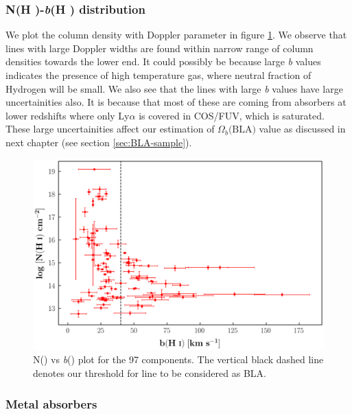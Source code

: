 \subsubsection*{N(H \hspace*{-0.6mm}{\footnotesize I})-\emph{b}(H \hspace*{-0.6mm}{\footnotesize I}) distribution} 

We plot the  column density with Doppler parameter in figure \ref{fig:NHi_bHi}. We observe that lines with large Doppler widths are found within narrow range of column densities towards the lower end. It could possibly be because large \emph{b} values indicates the presence of high temperature gas, where neutral fraction of Hydrogen will be small. We also see that the lines with large \emph{b} values have large uncertainities also. It is because that most of these are coming from absorbers at lower redshifts where only Ly$\alpha$ is covered in COS/FUV, which is saturated. These large uncertainities affect our estimation of $\Omega_b\text{(BLA)}$ value as discussed in next chapter (see section \ref{sec:BLA-sample}). 

\begin{figure}[!h]
    \centering
    \includegraphics[width=\linewidth]{Figures/NHi_vs_bHi.png}
    \caption{N() vs \emph{b}() plot for the 97  components. The vertical black dashed line denotes our threshold for line to be considered as BLA.}
    \label{fig:NHi_bHi}
\end{figure}

\subsubsection{Metal absorbers}

